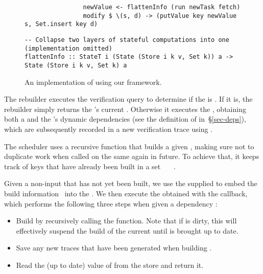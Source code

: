 \begin{figure}
\begin{verbatim}
                newValue <- flattenInfo (run newTask fetch)
                modify $ \(s, d) -> (putValue key newValue s, Set.insert key d)
\end{verbatim}
\vspace{0mm}
\begin{verbatim}
-- Collapse two layers of stateful computations into one (implementation omitted)
flattenInfo :: StateT i (State (Store i k v, Set k)) a -> State (Store i k v, Set k) a
\end{verbatim}
\vspace{-3mm}
\caption{An implementation of \Shake using our framework.}\label{fig-shake-implementation}
\vspace{-6mm}
\end{figure}

The rebuilder executes the verification query  to determine if the
 is . If it is, the rebuilder simply returns the 's
current . Otherwise it executes the , obtaining both a
 and the 's dynamic dependencies  (see the
definition of  in~\S\ref{sec-deps}), which are subsequently recorded
in a new verification trace using .

The  scheduler uses a recursive function  that builds
a given , making sure not to duplicate work when called on the same
 again in future. To achieve that, it keeps track of keys that have
already been built in a set ~\hs{::}~~.

Given a non-input  that has not yet been built, we use the supplied
 to embed the build information~ into the .
We then execute the obtained  with the  callback, which
performs the following three steps when given a dependency :

\begin{itemize}
    \item Build  by recursively calling the  function. Note
          that if  is dirty, this will effectively suspend the build of
          the current  until  is brought up to date.
    \item Save any new traces that have been generated when building .
    \item Read the (up to date) value of  from the store and return it.
\end{itemize}

